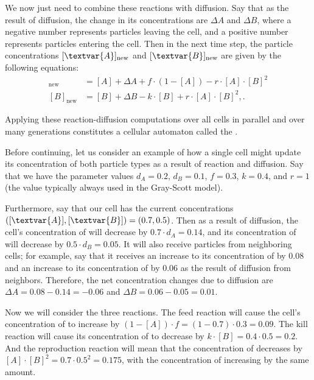 We now just need to combine these reactions with diffusion. Say that as the result of diffusion, the change in its concentrations are $\Delta A$ and $\Delta B$, where a negative number represents particles leaving the cell, and a positive number represents particles entering the cell. Then in the next time step, the particle concentrations $[\textvar{A}]_{\text{new}}$ and $[\textvar{B}]_{\text{new}}$ are given by the following equations:
\begin{align*}
[A]_{\text{new}} & = [A] + \Delta A + f \cdot (1-[A]) - r \cdot [A] \cdot [B]^2\\
[B]_{\text{new}} & = [B] + \Delta B - k \cdot [B] + r \cdot [A] \cdot [B]^2,.
\end{align*}

\noindent Applying these reaction-diffusion computations over all cells in parallel and over many generations constitutes a cellular automaton called the .

Before continuing, let us consider an example of how a single cell might update its concentration of both particle types as a result of reaction and diffusion.  Say that we have the parameter values $d_A = 0.2$, $d_B = 0.1$, $f = 0.3$, $k = 0.4$, and $r = 1$ (the value typically always used in the Gray-Scott model).

Furthermore, say that our cell has the current concentrations $([\textvar{A}], [\textvar{B}]) = (0.7, 0.5)$. Then as a result of diffusion, the cell's concentration of  will decrease by $0.7 \cdot d_A = 0.14$, and its concentration of  will decrease by $0.5 \cdot d_B = 0.05$. It will also receive particles from neighboring cells; for example, say that it receives an increase to its concentration of  by 0.08 and an increase to its concentration of  by 0.06 as the result of diffusion from neighbors. Therefore, the net concentration changes due to diffusion are $\Delta A  = 0.08 - 0.14 = -0.06$ and $\Delta B = 0.06 - 0.05 = 0.01$.

Now we will consider the three reactions. The feed reaction will cause the cell's concentration of  to increase by $(1 - [A]) \cdot f = (1-0.7) \cdot 0.3 = 0.09$. The kill reaction will cause its concentration of  to decrease by $k \cdot [B] = 0.4 \cdot 0.5 = 0.2$. And the reproduction reaction will mean that the concentration of  decreases by $[A] \cdot [B]^2 = 0.7 \cdot 0.5^2 = 0.175$, with the concentration of  increasing by the same amount.

